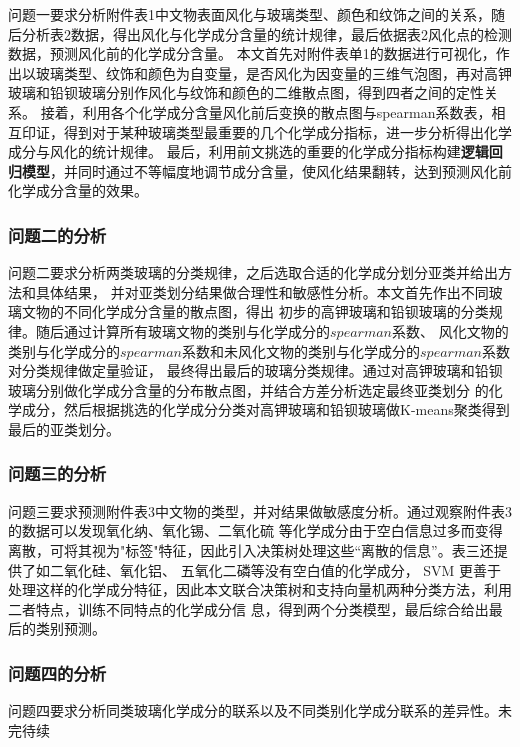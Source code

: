 \documentclass[withoutpreface,bwprint]{cumcmthesis} %
\begin{document}
问题一要求分析附件表1中文物表面风化与玻璃类型、颜色和纹饰之间的关系，随后分析表2数据，得出风化与化学成分含量的统计规律，最后依据表2风化点的检测数据，预测风化前的化学成分含量。 本文首先对附件表单1的数据进行可视化，作出以玻璃类型、纹饰和颜色为自变量，是否风化为因变量的三维气泡图，再对高钾玻璃和铅钡玻璃分别作风化与纹饰和颜色的二维散点图，得到四者之间的定性关系。 接着，利用各个化学成分含量风化前后变换的散点图与spearman系数表，相互印证，得到对于某种玻璃类型最重要的几个化学成分指标，进一步分析得出化学成分与风化的统计规律。 最后，利用前文挑选的重要的化学成分指标构建\textbf{逻辑回归模型}，并同时通过不等幅度地调节成分含量，使风化结果翻转，达到预测风化前化学成分含量的效果。

\subsubsection{问题二的分析}

问题二要求分析两类玻璃的分类规律，之后选取合适的化学成分划分亚类并给出方法和具体结果， 并对亚类划分结果做合理性和敏感性分析。本文首先作出不同玻璃文物的不同化学成分含量的散点图，得出 初步的高钾玻璃和铅钡玻璃的分类规律。随后通过计算所有玻璃文物的类别与化学成分的$spearman$系数、 风化文物的类别与化学成分的$spearman$系数和未风化文物的类别与化学成分的$spearman$系数对分类规律做定量验证， 最终得出最后的玻璃分类规律。通过对高钾玻璃和铅钡玻璃分别做化学成分含量的分布散点图，并结合方差分析选定最终亚类划分 的化学成分，然后根据挑选的化学成分分类对高钾玻璃和铅钡玻璃做K-means聚类得到最后的亚类划分。

\subsubsection{问题三的分析}

问题三要求预测附件表3中文物的类型，并对结果做敏感度分析。通过观察附件表3的数据可以发现氧化纳、氧化锡、二氧化硫 等化学成分由于空白信息过多而变得离散，可将其视为"标签"特征，因此引入决策树处理这些“离散的信息”。表三还提供了如二氧化硅、氧化铝、 五氧化二磷等没有空白值的化学成分， SVM 更善于处理这样的化学成分特征，因此本文联合决策树和支持向量机两种分类方法，利用二者特点，训练不同特点的化学成分信 息，得到两个分类模型，最后综合给出最后的类别预测。

\subsubsection{问题四的分析}

问题四要求分析同类玻璃化学成分的联系以及不同类别化学成分联系的差异性。未完待续
\end{document}
